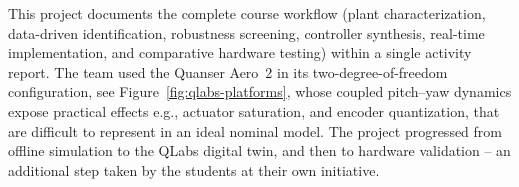 \documentclass[journal]{IEEEtran}
\begin{document}

This project
documents the complete course workflow (plant
characterization, data-driven identification, robustness screening, controller
synthesis, real-time implementation, and comparative hardware testing) within
a single activity report. The team used the Quanser Aero~2 in its
two-degree-of-freedom configuration, see Figure~\ref{fig:qlabs-platforms}, whose coupled pitch--yaw dynamics expose practical effects e.g., %
actuator saturation, and encoder quantization, that are difficult to represent in an ideal nominal model. The project progressed from offline simulation to the QLabs
digital twin, and then to hardware validation -- an additional step taken by the students at their own initiative. 
%
\end{document}
